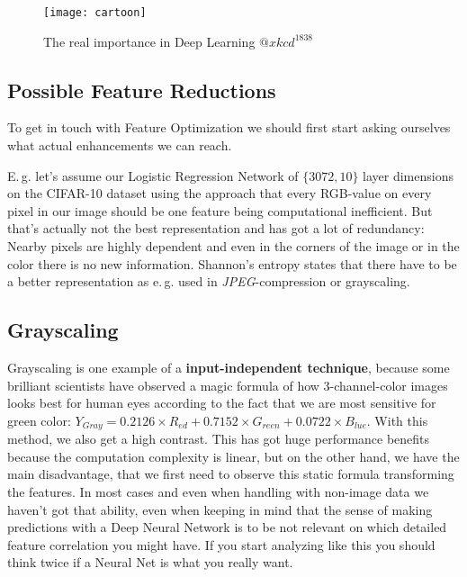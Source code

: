 \documentclass[dvipsnames,twocolumn]{scrartcl}
\begin{document}
	\begin{figure}
		\begin{center}
			\caption{The real importance in Deep Learning \href{https://xkcd.com/1838/}{$@xkcd^{1838}$}}
			\label{fig:cartoon}
			\texttt{[image: cartoon]}
		\end{center}
	\end{figure}
	
	\subsection{Possible Feature Reductions}
	
	To get in touch with Feature Optimization we should first start asking ourselves what actual enhancements we can reach.
	
	E.\,g. let's assume our Logistic Regression Network of $\{3072, 10\}$ layer dimensions on the CIFAR-10 dataset using the approach that every RGB-value on every pixel in our image should be one feature being computational inefficient. But that's actually not the best representation and has got a lot of redundancy: Nearby pixels are highly dependent and even in the corners of the image or in the color there is no new information. Shannon's entropy states that there have to be a better representation as e.\,g. used in \emph{JPEG}-compression or grayscaling.
	
	\subsection{Grayscaling}
	
	Grayscaling is one example of a \textbf{input-independent technique}, because some brilliant scientists have observed a magic formula of how 3-channel-color images looks best for human eyes according to the fact that we are most sensitive for green color: $Y_{Gray} = 0.2126\times R_{ed} + 0.7152\times G_{reen} + 0.0722\times B_{lue}$. With this method, we also get a high contrast. This has got huge performance benefits because the computation complexity is linear, but on the other hand, we have the main disadvantage, that we first need to observe this static formula transforming the features. In most cases and even when handling with non-image data we haven't got that ability, even when keeping in mind that the sense of making predictions with a Deep Neural Network is to be not relevant on which detailed feature correlation you might have. If you start analyzing like this you should think twice if a Neural Net is what you really want.\\
	
\end{document}
